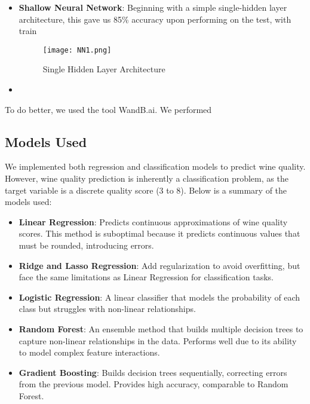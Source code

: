 \documentclass[10pt,twocolumn,letterpaper]{article}
\begin{document}
\begin{itemize}
    \item \textbf{Shallow Neural Network}: Beginning with a simple single-hidden layer architecture, this gave us 85\% accuracy upon performing on the test, with train 
    \begin{figure}
        \centering
        \texttt{[image: NN1.png]}
        \caption{Single Hidden Layer Architecture}
        \label{Shallow NN}
    \end{figure}
    \item 


\end{itemize}

To do better, we used the tool WandB.ai. We performed 

\subsection{Models Used}
We implemented both regression and classification models to predict wine quality. However, wine quality prediction is inherently a classification problem, as the target variable is a discrete quality score (3 to 8). Below is a summary of the models used:

\begin{itemize}
    \item \textbf{Linear Regression}: Predicts continuous approximations of wine quality scores. This method is suboptimal because it predicts continuous values that must be rounded, introducing errors.
    
    \item \textbf{Ridge and Lasso Regression}: Add regularization to avoid overfitting, but face the same limitations as Linear Regression for classification tasks.
    
    \item \textbf{Logistic Regression}: A linear classifier that models the probability of each class but struggles with non-linear relationships.
    
    \item \textbf{Random Forest}: An ensemble method that builds multiple decision trees to capture non-linear relationships in the data. Performs well due to its ability to model complex feature interactions.
    
    \item \textbf{Gradient Boosting}: Builds decision trees sequentially, correcting errors from the previous model. Provides high accuracy, comparable to Random Forest.
\end{itemize}
\end{document}
